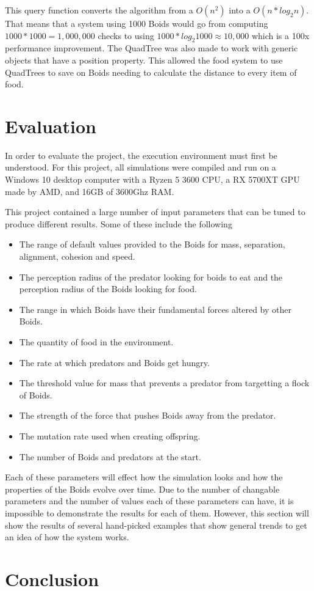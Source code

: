 \documentclass{egpubl}
\begin{document}
\par
This query function converts the algorithm from a $O( n^2 )$ into a $O(n * log_2{n})$. That means that a system using 1000 Boids would go from computing $1000 * 1000 = 1,000,000$ checks to using $1000 * log_2{1000} \approx 10,000$ which is a 100x performance improvement. The QuadTree was also made to work with generic objects that have a position property. This allowed the food system to use QuadTrees to save on Boids needing to calculate the distance to every item of food.
\section{Evaluation}
In order to evaluate the project, the execution environment must first be understood. For this project, all simulations were compiled and run on a Windows 10 desktop computer with a Ryzen 5 3600 CPU, a RX 5700XT GPU made by AMD, and 16GB of 3600Ghz RAM.
\par
This project contained a large number of input parameters that can be tuned to produce different results. Some of these include the following
\begin{itemize}
    \item The range of default values provided to the Boids for mass, separation, alignment, cohesion and speed.
    \item The perception radius of the predator looking for boids to eat and the perception radius of the Boids looking for food.
    \item The range in which Boids have their fundamental forces altered by other Boids.
    \item The quantity of food in the environment.
    \item The rate at which predators and Boids get hungry.
    \item The threshold value for mass that prevents a predator from targetting a flock of Boids. 
    \item The strength of the force that pushes Boids away from the predator.
    \item The mutation rate used when creating offspring.
    \item The number of Boids and predators at the start.
\end{itemize}
Each of these parameters will effect how the simulation looks and how the properties of the Boids evolve over time. Due to the number of changable parameters and the number of values each of these parameters can have, it is impossible to demonstrate the results for each of them. However, this section will show the results of several hand-picked examples that show general trends to get an idea of how the system works.
\section{Conclusion}
\printbibliography                
\end{document}
